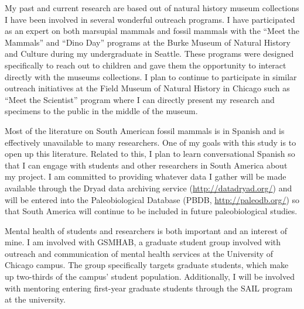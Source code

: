 \documentclass[11pt,letterpaper]{article}
\begin{document}
My past and current research are based out of natural history museum collections I have been involved in several wonderful outreach programs. I have participated as an expert on both marsupial mammals and fossil mammals with the ``Meet the Mammals'' and ``Dino Day'' programs at the Burke Museum of Natural History and Culture during my undergraduate in Seattle. These programs were designed specifically to reach out to children and gave them the opportunity to interact directly with the museums collections. I plan to continue to participate in similar outreach initiatives at the Field Museum of Natural History in Chicago such as ``Meet the Scientist'' program where I can directly present my research and specimens to the public in the middle of the museum.

Most of the literature on South American fossil mammals is in Spanish and is effectively unavailable to many researchers. One of my goals with this study is to open up this literature. Related to this, I plan to learn conversational Spanish so that I can engage with students and other researchers in South America about my project. I am committed to providing whatever data I gather will be made available through the Dryad data archiving service (\url{http://datadryad.org/}) and will be entered into the Paleobiological Database (PBDB, \url{http://paleodb.org/}) so that South America will continue to be included in future paleobiological studies. 

Mental health of students and researchers is both important and an interest of mine. I am involved with GSMHAB, a graduate student group involved with outreach and communication of mental health services at the University of Chicago campus. The group specifically targets graduate students, which make up two-thirds of the campus' student population. Additionally, I will be involved with mentoring entering first-year graduate students through the SAIL program at the university.


\clearpage
\setcounter{page}{1}

\end{document}
